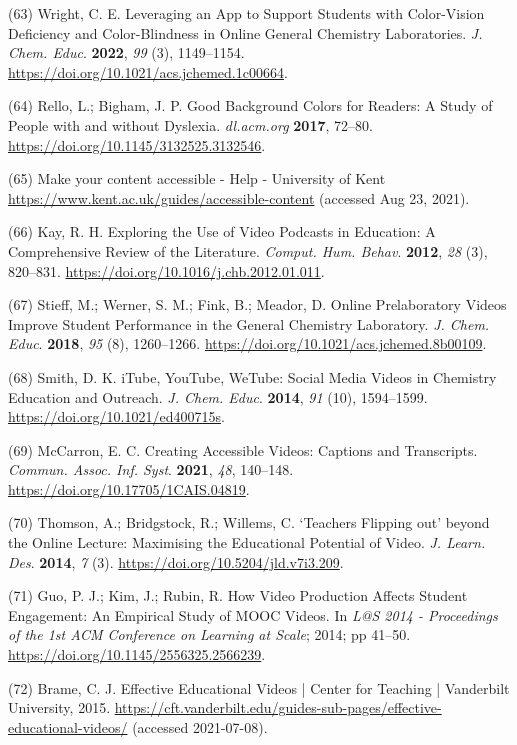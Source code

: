 \documentclass[11.5pt]{sig-alternate} %
\begin{document}
(63)	Wright, C. E. Leveraging an App to Support Students with Color-Vision Deficiency and Color-Blindness in Online General Chemistry Laboratories. \textit{J. Chem. Educ}. \textbf{2022}, \textit{99} (3), 1149–1154. \url{https://doi.org/10.1021/acs.jchemed.1c00664}.

(64)	Rello, L.; Bigham, J. P. Good Background Colors for Readers: A Study of People with and without Dyslexia. \textit{dl.acm.org} \textbf{2017}, 72–80. \url{https://doi.org/10.1145/3132525.3132546}.

(65)	Make your content accessible - Help - University of Kent \url{https://www.kent.ac.uk/guides/accessible-content} (accessed Aug 23, 2021).

(66)	Kay, R. H. Exploring the Use of Video Podcasts in Education: A Comprehensive Review of the Literature. \textit{Comput. Hum. Behav}. \textbf{2012}, \textit{28} (3), 820–831. \url{https://doi.org/10.1016/j.chb.2012.01.011}.

(67)	Stieff, M.; Werner, S. M.; Fink, B.; Meador, D. Online Prelaboratory Videos Improve Student Performance in the General Chemistry Laboratory. \textit{J. Chem. Educ}. \textbf{2018}, \textit{95} (8), 1260–1266. \url{https://doi.org/10.1021/acs.jchemed.8b00109}.

(68)	Smith, D. K. iTube, YouTube, WeTube: Social Media Videos in Chemistry Education and Outreach. \textit{J. Chem. Educ}. \textbf{2014}, \textit{91} (10), 1594–1599. \url{https://doi.org/10.1021/ed400715s}.

(69)	McCarron, E. C. Creating Accessible Videos: Captions and Transcripts. \textit{Commun. Assoc. Inf. Syst}. \textbf{2021}, \textit{48}, 140–148. \url{https://doi.org/10.17705/1CAIS.04819}.

(70)	Thomson, A.; Bridgstock, R.; Willems, C. ‘Teachers Flipping out’ beyond the Online Lecture: Maximising the Educational Potential of Video. \textit{J. Learn. Des}. \textbf{2014}, \textit{7} (3). \url{https://doi.org/10.5204/jld.v7i3.209}.

(71)	Guo, P. J.; Kim, J.; Rubin, R. How Video Production Affects Student Engagement: An Empirical Study of MOOC Videos. In \textit{L@S 2014 - Proceedings of the 1st ACM Conference on Learning at Scale}; 2014; pp 41–50. \url{https://doi.org/10.1145/2556325.2566239}.

(72)	Brame, C. J. Effective Educational Videos | Center for Teaching | Vanderbilt University, 2015. \url{https://cft.vanderbilt.edu/guides-sub-pages/effective-educational-videos/} (accessed 2021-07-08).
\end{document}

